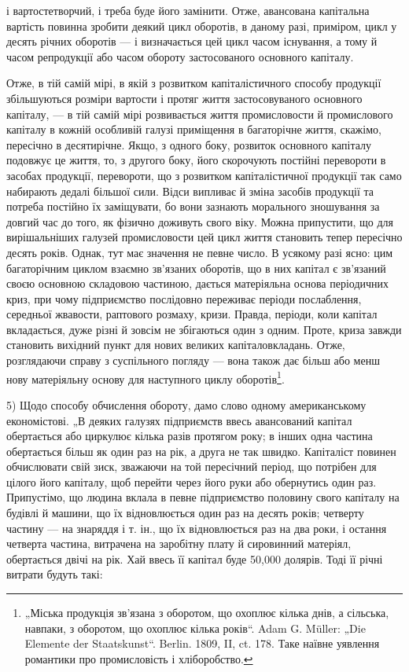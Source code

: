 \parcont{}  %
і вартостетворчий, і треба буде його замінити. Отже, авансована капітальна
вартість повинна зробити деякий цикл оборотів, в даному разі, приміром, цикл
у десять річних оборотів — і визначається цей цикл часом існування,
а тому й часом репродукції або часом обороту застосованого основного
капіталу.

Отже, в тій самій мірі, в якій з розвитком капіталістичного способу
продукції збільшуються розміри вартости і протяг життя застосовуваного
основного капіталу, — в тій самій мірі розвивається життя промисловости
й промислового капіталу в кожній особливій галузі приміщення в багаторічне
життя, скажімо, пересічно в десятирічне. Якщо, з одного боку,
розвиток основного капіталу подовжує це життя, то, з другого боку,
його скорочують постійні перевороти в засобах продукції, перевороти,
що з розвитком капіталістичної продукції так само набирають дедалі
більшої сили. Відси випливає й зміна засобів продукції та потреба постійно
їх заміщувати, бо вони зазнають морального зношування за довгий
час до того, як фізично доживуть свого віку. Можна припустити, що
для вирішальніших галузей промисловости цей цикл життя становить тепер
пересічно десять років. Однак, тут має значення не певне число. В усякому
разі ясно: цим багаторічним циклом взаємно зв’язаних оборотів, що
в них капітал є зв’язаний своєю основною складовою частиною, дається
матеріяльна основа періодичних криз, при чому підприємство послідовно
переживає періоди послаблення, середньої жвавости, раптового розмаху,
кризи. Правда, періоди, коли капітал вкладається, дуже різні й зовсім не
збігаються один з одним. Проте, криза завжди становить вихідний пункт
для нових великих капіталовкладань. Отже, розглядаючи справу з суспільного
погляду — вона також дає більш або менш нову матеріяльну
основу для наступного циклу оборотів\footnote{
„Міська продукція зв’язана з оборотом, що охоплює кілька днів, а сільська,
навпаки, з оборотом, що охоплює кілька років“. Adam G. Müller: „Die Elemente
der Staatskunst“. Berlin. 1809, II, ct. 178. Таке наївне уявлення романтики
про промисловість і хліборобство.
}.

5) Щодо способу обчислення обороту, дамо слово одному американському
економістові. „В деяких галузях підприємств ввесь авансований
капітал обертається або циркулює кілька разів протягом року; в інших
одна частина обертається більш як один раз на рік, а друга не так швидко.
Капіталіст повинен обчислювати свій зиск, зважаючи на той пересічний
період, що потрібен для цілого його капіталу, щоб перейти через його
руки або обернутись один раз. Припустімо, що людина вклала в певне
підприємство половину свого капіталу на будівлі й машини, що їх відновлюється
один раз на десять років; четверту частину — на знаряддя і т. ін.,
що їх відновлюється раз на два роки, і остання четверта частина, витрачена
на заробітну плату й сировинний матеріял, обертається двічі на рік.
Хай ввесь її капітал буде 50,000 долярів. Тоді її річні витрати будуть
такі:
